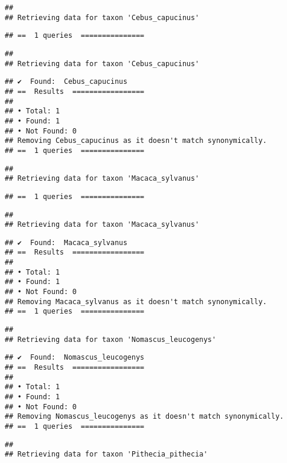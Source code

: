 \documentclass[
]{article}
\begin{document}
\begin{verbatim}
## 
## Retrieving data for taxon 'Cebus_capucinus'
\end{verbatim}

\begin{verbatim}
## ==  1 queries  ===============
\end{verbatim}

\begin{verbatim}
## 
## Retrieving data for taxon 'Cebus_capucinus'
\end{verbatim}

\begin{verbatim}
## ✔  Found:  Cebus_capucinus
## ==  Results  =================
## 
## • Total: 1 
## • Found: 1 
## • Not Found: 0
## Removing Cebus_capucinus as it doesn't match synonymically.
## ==  1 queries  ===============
\end{verbatim}

\begin{verbatim}
## 
## Retrieving data for taxon 'Macaca_sylvanus'
\end{verbatim}

\begin{verbatim}
## ==  1 queries  ===============
\end{verbatim}

\begin{verbatim}
## 
## Retrieving data for taxon 'Macaca_sylvanus'
\end{verbatim}

\begin{verbatim}
## ✔  Found:  Macaca_sylvanus
## ==  Results  =================
## 
## • Total: 1 
## • Found: 1 
## • Not Found: 0
## Removing Macaca_sylvanus as it doesn't match synonymically.
## ==  1 queries  ===============
\end{verbatim}

\begin{verbatim}
## 
## Retrieving data for taxon 'Nomascus_leucogenys'
\end{verbatim}

\begin{verbatim}
## ✔  Found:  Nomascus_leucogenys
## ==  Results  =================
## 
## • Total: 1 
## • Found: 1 
## • Not Found: 0
## Removing Nomascus_leucogenys as it doesn't match synonymically.
## ==  1 queries  ===============
\end{verbatim}

\begin{verbatim}
## 
## Retrieving data for taxon 'Pithecia_pithecia'
\end{verbatim}
\end{document}
